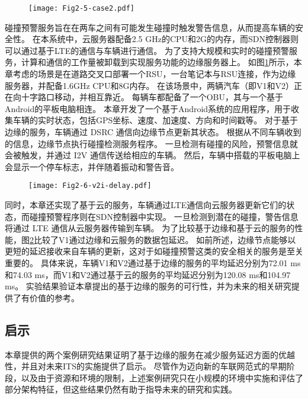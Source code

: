 \begin{figure}[h] 
	\centering
	\texttt{[image: Fig2-5-case2.pdf]}
	\label{fig 2-5}
\end{figure}

碰撞预警服务旨在在两车之间有可能发生碰撞时触发警告信息，从而提高车辆的安全性。
在本系统中，云服务器配备2.5 GHz的CPU和2G的内存，而SDN控制器则可以通过基于LTE的通信与车辆进行通信。
为了支持大规模和实时的碰撞预警服务，计算和通信的工作量被卸载到实现服务功能的边缘服务器上。
如图\ref{fig 2-5}所示，本章考虑的场景是在道路交叉口部署一个RSU，一台笔记本与RSU连接，作为边缘服务器，并配备1.6GHz CPU和8G内存。
在该场景中，两辆汽车（即V1和V2）正在向十字路口移动，并相互靠近。
每辆车都配备了一个OBU，其与一个基于Android的平板电脑相连。
本章开发了一个基于Android系统的应用程序，用于收集车辆的实时状态，包括GPS坐标、速度、加速度、方向和时间戳等。
对于基于边缘的服务，车辆通过 DSRC 通信向边缘节点更新其状态。
根据从不同车辆收到的信息，边缘节点执行碰撞检测服务程序。
一旦检测有碰撞的风险，预警信息就会被触发，并通过 I2V 通信传送给相应的车辆。
然后，车辆中搭载的平板电脑上会显示一个停车标志，并伴随着振动和警告音。

\begin{figure}[h]
\centering
  \texttt{[image: Fig2-6-v2i-delay.pdf]}
  \label{fig 2-6}
\end{figure}

同时，本章还实现了基于云的服务，车辆通过LTE通信向云服务器更新它们的状态，而碰撞预警程序则在SDN控制器中实现。
一旦检测到潜在的碰撞，警告信息将通过 LTE 通信从云服务器传输到车辆。
为了比较基于边缘和基于云的服务的性能，图\ref{fig 2-6}比较了V1通过边缘和云服务的数据包延迟。
如前所述，边缘节点能够以更短的延迟接收来自车辆的更新，这对于如碰撞预警这类的安全相关的服务是至关重要的。
具体来说，车辆V1和V2通过基于边缘的服务的平均延迟分别为72.01 ms和74.03 ms，而V1和V2通过基于云的服务的平均延迟分别为120.08 ms和104.97 ms。
实验结果验证本章提出的基于边缘的服务的可行性，并为未来的相关研究提供了有价值的参考。

\subsection{启示}

本章提供的两个案例研究结果证明了基于边缘的服务在减少服务延迟方面的优越性，并且对未来ITS的实施提供了启示。
尽管作为迈向新的车联网范式的早期阶段，以及由于资源和环境的限制，上述案例研究只在小规模的环境中实施和评估了部分架构特征，但这些结果仍然有助于指导未来的研究和实践。

